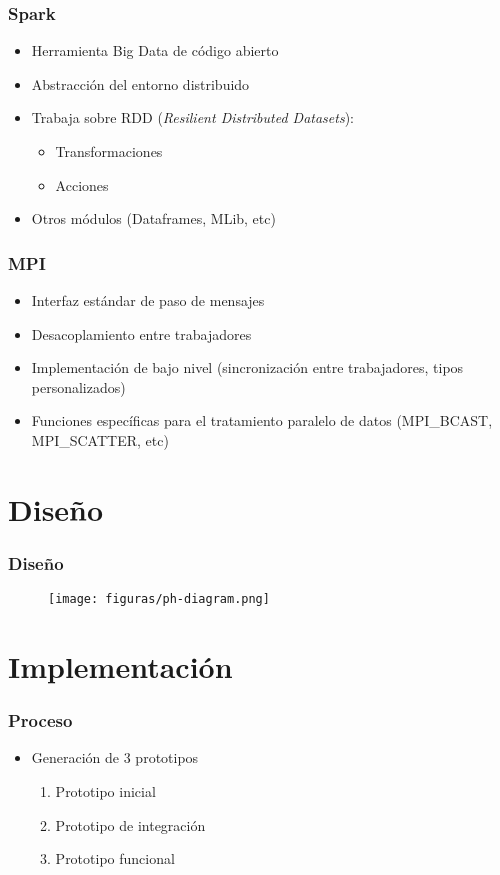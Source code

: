 \documentclass{beamer}
\begin{document}
\begin{frame}
    \frametitle{Spark}
    \begin{itemize}
        \item Herramienta Big Data de código abierto \pause
        \item Abstracción del entorno distribuido \pause
        \item Trabaja sobre RDD (\textit{Resilient Distributed Datasets}):
        \begin{itemize}
            \item Transformaciones
            \item Acciones \pause
        \end{itemize}
        \item Otros módulos (Dataframes, MLib, etc)
    \end{itemize}
\end{frame}

\begin{frame}{}
    \frametitle{MPI}
    \begin{itemize}
        \item Interfaz estándar de paso de mensajes
        \item Desacoplamiento entre trabajadores
        \item Implementación de bajo nivel (sincronización entre trabajadores, tipos personalizados)
        \item Funciones específicas para el tratamiento paralelo de datos (MPI\_BCAST, MPI\_SCATTER, etc)
    \end{itemize}
\end{frame}

\section{Diseño}

\begin{frame}[plain]
    \frametitle{Diseño}
    \begin{figure}[H]
        \centerline{\texttt{[image: figuras/ph-diagram.png]}}
        \label{fig:ph-diagram}
    \end{figure}
\end{frame}

\section{Implementación}

\begin{frame}{}
    \frametitle{Proceso}
    \begin{itemize}
        \item Generación de 3 prototipos \pause
        \begin{enumerate}
            \item Prototipo inicial \pause
            \item Prototipo de integración \pause
            \item Prototipo funcional
        \end{enumerate}
    \end{itemize}
\end{frame}
\end{document}

